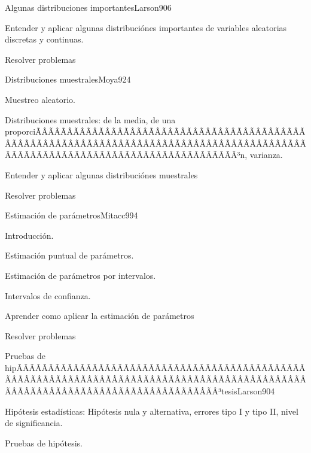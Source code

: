 \begin{sumilla}
\begin{unit}{Algunas distribuciones importantes}{Larson90}{6}
   \begin{objetivos}
         \item  Entender y aplicar algunas distribuci\'ones importantes de variables aleatorias discretas y continuas.
         \item  Resolver problemas
   \end{objetivos}
\end{unit}

\begin{unit}{Distribuciones muestrales}{Moya92}{4}
   \begin{topicos}
         \item  Muestreo aleatorio.
	 \item  Distribuciones muestrales: de la media, de una proporciÃÂÃÂÃÂÃÂÃÂÃÂÃÂÃÂÃÂÃÂÃÂÃÂÃÂÃÂÃÂÃÂÃÂÃÂÃÂÃÂÃÂÃÂÃÂÃÂÃÂÃÂÃÂÃÂÃÂÃÂÃÂÃÂÃÂÃÂÃÂÃÂÃÂÃÂÃÂÃÂÃÂÃÂÃÂÃÂÃÂÃÂÃÂÃÂÃÂÃÂÃÂÃÂÃÂÃÂÃÂÃÂÃÂÃÂÃÂÃÂÃÂÃÂÃÂÃÂ³n, varianza.
   \end{topicos}

   \begin{objetivos}
         \item  Entender y aplicar algunas distribuci\'ones muestrales
         \item  Resolver problemas
   \end{objetivos}
\end{unit}

\begin{unit}{Estimaci\'on de par\'ametros}{Mitacc99}{4}
   \begin{topicos}
         \item  Introducci\'on.
	 \item  Estimaci\'on puntual de par\'ametros.
	\item Estimaci\'on de par\'ametros por intervalos.
	\item Intervalos de confianza.
   \end{topicos}

   \begin{objetivos}
         \item  Aprender como aplicar la estimaci\'on de par\'ametros
         \item  Resolver problemas
   \end{objetivos}
\end{unit}

\begin{unit}{Pruebas de hipÃÂÃÂÃÂÃÂÃÂÃÂÃÂÃÂÃÂÃÂÃÂÃÂÃÂÃÂÃÂÃÂÃÂÃÂÃÂÃÂÃÂÃÂÃÂÃÂÃÂÃÂÃÂÃÂÃÂÃÂÃÂÃÂÃÂÃÂÃÂÃÂÃÂÃÂÃÂÃÂÃÂÃÂÃÂÃÂÃÂÃÂÃÂÃÂÃÂÃÂÃÂÃÂÃÂÃÂÃÂÃÂÃÂÃÂÃÂÃÂÃÂÃÂÃÂÃÂ³tesis}{Larson90}{4}
   \begin{topicos}
         \item  Hip\'otesis estad\'isticas: Hip\'otesis nula y alternativa, errores tipo I y tipo II, nivel de significancia.
	 \item  Pruebas de hip\'otesis.
   \end{topicos}


\end{unit}
\end{sumilla}
